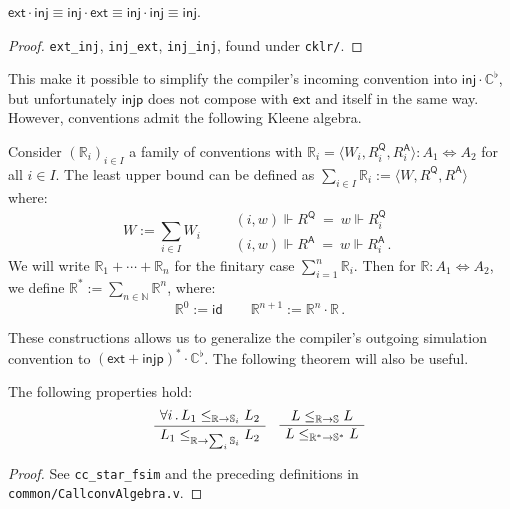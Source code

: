\documentclass[sigplan,10pt,review,anonymous]{acmart}
\newcommand{\kw}[1]{\ensuremath{ \mathsf{#1} }}
\begin{document}
\begin{theorem} \label{thm:extinj}
$
  \kw{ext} \cdot \kw{inj} \equiv
  \kw{inj} \cdot \kw{ext} \equiv
  \kw{inj} \cdot \kw{inj} \equiv
  \kw{inj}
$.
\begin{proof}
\texttt{ext\_inj}, \texttt{inj\_ext}, \texttt{inj\_inj},
found under \texttt{cklr/}.
\end{proof}
\end{theorem}

This make it possible to simplify
the compiler's incoming convention
into $\kw{inj} \cdot \mathbb{C}^\flat$,
but unfortunately \kw{injp}
does not compose with \kw{ext} and itself in the same way.
However, conventions
admit the following Kleene algebra.

\begin{definition} %
Consider $(\mathbb{R}_i)_{i \in I}$
a family of conventions
with
$\mathbb{R}_i = \langle W_i, R_i^\kw{Q}, R_i^\kw{A} \rangle
  : A_1 \Leftrightarrow A_2$
for all $i \in I$.
The least upper bound
can be defined as
$\sum_{i \in I} \mathbb{R}_i := \langle W, R^\kw{Q}, R^\kw{A} \rangle$
where:
\[
  W := \sum_{i \in I} W_i  \qquad
  \begin{array}{l}
  (i, w) \Vdash R^\kw{Q} \: = \: w \Vdash R_i^\kw{Q} \\[1ex]
  (i, w) \Vdash R^\kw{A} \: = \: w \Vdash R_i^\kw{A} \,.
  \end{array}
\]
We will write $\mathbb{R}_1 + \cdots + \mathbb{R}_n$
for the finitary case $\sum_{i=1}^n \mathbb{R}_i$.
Then for $\mathbb{R} : A_1 \Leftrightarrow A_2$,
we define
$\mathbb{R}^* := \sum_{n \in \mathbb{N}} \mathbb{R}^n$,
where:
\[
  \mathbb{R}^0 := \kw{id} \qquad
  \mathbb{R}^{n+1} := \mathbb{R}^n \cdot \mathbb{R} \,.
\]
\end{definition}

These constructions allows us to generalize the compiler's
outgoing simulation convention to
$(\kw{ext} + \kw{injp})^* \cdot \mathbb{C}^\flat$.
The following theorem will also be useful.

\begin{theorem} \label{thm:simk} %
The following properties hold:
\[
  \AxiomC{$\forall i \,.\,
    L_1 \le_{\mathbb{R} \rightarrow \mathbb{S}_i} L_2$}
  \UnaryInfC{$
    L_1 \le_{\mathbb{R} \rightarrow \sum_i \mathbb{S}_i} L_2$}
  \DisplayProof
  \quad
  \AxiomC{$L \le_{\mathbb{R} \rightarrow \mathbb{S}} L$}
  \UnaryInfC{$L \le_{\mathbb{R}^* \rightarrow \mathbb{S}^*} L$}
  \DisplayProof
\]
\begin{proof}
See \texttt{cc\_star\_fsim} and the preceding definitions
in \texttt{common/CallconvAlgebra.v}.
\end{proof}
\end{theorem}
\end{document}
